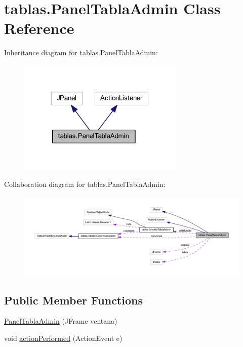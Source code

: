 \hypertarget{classtablas_1_1_panel_tabla_admin}{}\section{tablas.\+Panel\+Tabla\+Admin Class Reference}
\label{classtablas_1_1_panel_tabla_admin}


Inheritance diagram for tablas.\+Panel\+Tabla\+Admin\+:
\nopagebreak
\begin{figure}[H]
\begin{center}
\leavevmode
\includegraphics[width=224pt]{classtablas_1_1_panel_tabla_admin__inherit__graph}
\end{center}
\end{figure}


Collaboration diagram for tablas.\+Panel\+Tabla\+Admin\+:
\nopagebreak
\begin{figure}[H]
\begin{center}
\leavevmode
\includegraphics[width=350pt]{classtablas_1_1_panel_tabla_admin__coll__graph}
\end{center}
\end{figure}
\subsection*{Public Member Functions}
\begin{DoxyCompactItemize}
\item 
\mbox{\hyperlink{classtablas_1_1_panel_tabla_admin_a3283fed069616ed856ffc3c576bba3a4}{Panel\+Tabla\+Admin}} (J\+Frame ventana)
\item 
void \mbox{\hyperlink{classtablas_1_1_panel_tabla_admin_ac51d1abc73d0958cce3b63c706fa2af9}{action\+Performed}} (Action\+Event e)
\end{DoxyCompactItemize}


